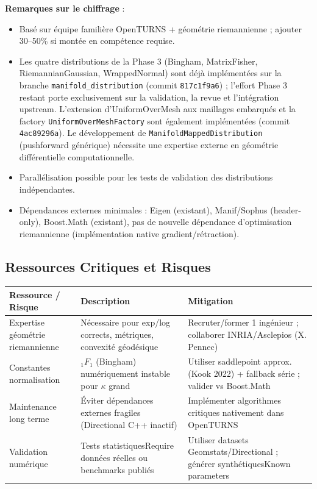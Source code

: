 \documentclass[11pt,a4paper]{article}
\begin{document}
\medskip
\noindent\textbf{Remarques sur le chiffrage} :
\begin{itemize}
    \item Basé sur équipe familière OpenTURNS + géométrie riemannienne ; ajouter 30--50\% si montée en compétence requise.
    \item Les quatre distributions de la Phase 3 (Bingham, MatrixFisher, RiemannianGaussian, WrappedNormal) sont déjà implémentées sur la branche \texttt{manifold\_distribution} (commit \texttt{817c1f9a6}) ; l'effort Phase 3 restant porte exclusivement sur la validation, la revue et l'intégration upstream. L'extension d'UniformOverMesh aux maillages embarqués et la factory \texttt{UniformOverMeshFactory} sont également implémentées (commit \texttt{4ac89296a}). Le développement de \texttt{ManifoldMappedDistribution} (pushforward générique) nécessite une expertise externe en géométrie différentielle computationnelle.
    \item Parallélisation possible pour les tests de validation des distributions indépendantes.
    \item Dépendances externes minimales : Eigen (existant), Manif/Sophus (header-only), Boost.Math (existant), pas de nouvelle dépendance d'optimisation riemannienne (implémentation native gradient/rétraction).
\end{itemize}

\subsection{Ressources Critiques et Risques}

\begin{longtable}{@{}p{3.5cm}p{5.5cm}p{5cm}@{}}
\toprule
\textbf{Ressource / Risque} & \textbf{Description} & \textbf{Mitigation} \\
\midrule
Expertise géométrie riemannienne & Nécessaire pour exp/log corrects, métriques, convexité géodésique & Recruter/former 1 ingénieur ; collaborer INRIA/Asclepios (X. Pennec) \\
Constantes normalisation & ${}_1F_1$ (Bingham) numériquement instable pour $\kappa$ grand & Utiliser saddlepoint approx. (Kook 2022) + fallback série ; valider vs Boost.Math \\
Maintenance long terme & Éviter dépendances externes fragiles (Directional C++ inactif) & Implémenter algorithmes critiques nativement dans OpenTURNS \\
Validation numérique & Tests statistiquesRequire données réelles ou benchmarks publiés & Utiliser datasets Geomstats/Directional ; générer synthétiquesKnown parameters \\
\bottomrule
\end{longtable}
\end{document}
